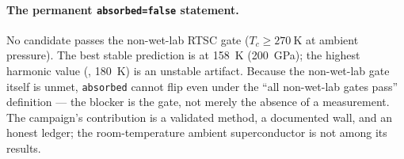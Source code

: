 \paragraph{The permanent \texttt{absorbed=false} statement.}
No candidate passes the non-wet-lab RTSC gate ($T_c \ge \SI{270}{\kelvin}$ at
ambient pressure). The best stable prediction is  at
\SI{158}{\kelvin} (\SI{200}{\giga\pascal}); the highest harmonic value
(, \SI{180}{\kelvin}) is an unstable artifact. Because the
non-wet-lab gate itself is unmet, \texttt{absorbed} cannot flip even under
the ``all non-wet-lab gates pass'' definition --- the blocker is the gate,
not merely the absence of a measurement. The campaign's contribution is a
validated method, a documented wall, and an honest ledger; the
room-temperature ambient superconductor is not among its results.
